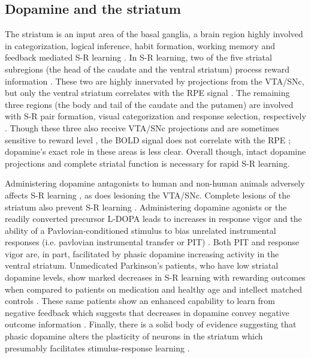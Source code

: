 \documentclass[doc]{apa}        %
\begin{document}
\subsection{Dopamine and the striatum} %
\label{sub:dopamine_and_the_basal_ganglia}
The striatum is an input area of the basal ganglia, a brain region highly involved in categorization, logical inference, habit formation, working memory and feedback mediated S-R learning \cite{Frank:2001p1996,Jin:2010p7199,SchmitzerTorbert:2004p5410,Seger:2008p6401,Seger:2010p7189,Yin:2006p5080}.  In S-R learning, two of the five striatal subregions (the head of the caudate and the ventral striatum) process reward information \cite{Yin:2005p5101,Yin:2008p6347,Schonberg:2009p6669}.  These two are highly innervated by projections from the VTA/SNc, but only the ventral striatum correlates with the RPE signal \cite{Haruno:2006p3979,Seger:2010p7189}.  The remaining three regions (the body and tail of the caudate and the putamen) are involved with S-R pair formation, visual categorization and response selection, respectively \cite{Seger:2008p6401,Seger:2010p7189}.  Though these three also receive VTA/SNc projections and are sometimes sensitive to reward level \cite{BischoffGrethe:2009p4570}, the BOLD signal does not correlate with the RPE \cite{Seger:2010p7189}; dopamine's exact role in these areas is less clear.  Overall though, intact dopamine projections and complete striatal function is necessary for rapid S-R learning.
   
Administering dopamine antagonists to human and non-human animals adversely affects S-R learning \cite{Pizzagalli:2010p7205}, as does lesioning the VTA/SNc.  Complete lesions of the striatum also prevent S-R learning \cite{Packard:2002p5074}.  Administering dopamine agonists or the readily converted precursor L-DOPA leads to increases in response vigor and the ability of a Pavlovian-conditioned stimulus to bias unrelated instrumental responses (i.e. pavlovian instrumental transfer or PIT) \cite{Winterbauer:2007p6352}. Both PIT and response vigor are, in part, facilitated by phasic dopamine increasing activity in the ventral striatum.  Unmedicated Parkinson's patients, who have low striatal dopamine levels, show marked decreases in S-R learning with rewarding outcomes when compared to patients on medication and healthy age and intellect matched controls \cite{Pizzagalli:2010p7205}.  These same patients show an enhanced capability to learn from negative feedback which suggests that decreases in dopamine convey negative outcome information \cite{Frank:2004p4709}.  Finally, there is a solid body of evidence suggesting that phasic dopamine alters the plasticity of neurons in the striatum which presumably facilitates stimulus-response learning \cite{Calabresi:2007p4284}.
\end{document}
